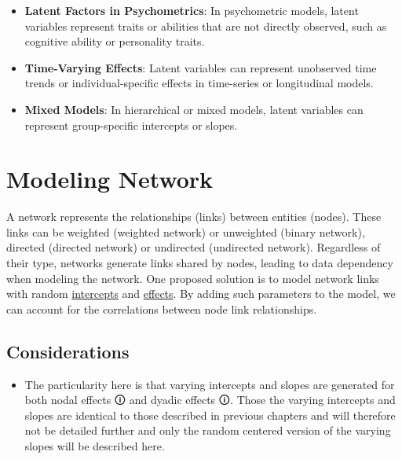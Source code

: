 \documentclass[
  letterpaper,
  DIV=11,
  numbers=noendperiod]{scrreprt}
\providecommand{\tightlist}{%
  \setlength{\itemsep}{0pt}\setlength{\parskip}{0pt}}\usepackage{longtable,booktabs,array}
\begin{document}
\begin{itemize}
\tightlist
\item
  \textbf{Latent Factors in Psychometrics}: In psychometric models,
  latent variables represent traits or abilities that are not directly
  observed, such as cognitive ability or personality traits.
\item
  \textbf{Time-Varying Effects}: Latent variables can represent
  unobserved time trends or individual-specific effects in time-series
  or longitudinal models.
\item
  \textbf{Mixed Models}: In hierarchical or mixed models, latent
  variables can represent group-specific intercepts or slopes.
\end{itemize}


\chapter{Modeling Network}\label{modeling-network}

A network represents the relationships (links) between entities (nodes).
These links can be weighted (weighted network) or unweighted (binary
network), directed (directed network) or undirected (undirected
network). Regardless of their type, networks generate links shared by
nodes, leading to data dependency when modeling the network. One
proposed solution is to model network links with random
\href{12.\%20Varying\%20intercepts.qmd}{intercepts} and
\href{13.\%20Varying\%20slopes.qmd}{effects}. By adding such parameters
to the model, we can account for the correlations between node link
relationships.

\section{Considerations}\label{considerations-17}

\begin{tcolorbox}[enhanced jigsaw, toptitle=1mm, opacityback=0, titlerule=0mm, breakable, bottomrule=.15mm, colframe=quarto-callout-caution-color-frame, arc=.35mm, coltitle=black, left=2mm, opacitybacktitle=0.6, leftrule=.75mm, toprule=.15mm, rightrule=.15mm, bottomtitle=1mm, colbacktitle=quarto-callout-caution-color!10!white, title=\textcolor{quarto-callout-caution-color}{\faFire}\hspace{0.5em}{Caution}, colback=white]

\begin{itemize}
\tightlist
\item
  The particularity here is that varying intercepts and slopes are
  generated for both \label{NodeF}{{nodal effects 🛈}} and
  \label{DyadicF}{{dyadic effects 🛈}}. Those the varying
  intercepts and slopes are identical to those described in previous
  chapters and will therefore not be detailed further and only the
  random centered version of the varying slopes will be described here.
\end{itemize}

\end{tcolorbox}
\end{document}
